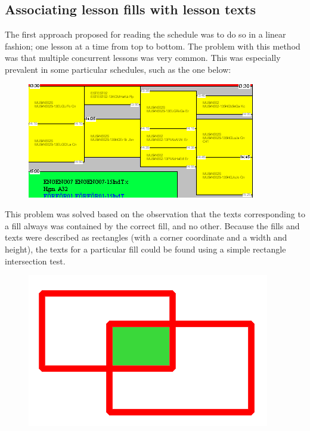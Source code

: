 \documentclass{article}
\begin{document}
	\subsection{Associating lesson fills with lesson texts}
	The first approach proposed for reading the schedule was to do so in a linear fashion; one lesson at a time from top to bottom. The problem with this method was that multiple concurrent lessons was very common. This was especially prevalent in some particular schedules, such as the one below:
	
	\begin{figure}[h]%
		\centering
		\includegraphics[width=0.7\linewidth]{images/schedule-13esmu}
		\caption{}
		\label{fig:schedule-13esmu}
	\end{figure}
	
	This problem was solved based on the observation that the texts corresponding to a fill always was contained by the correct fill, and no other. Because the fills and texts were described as rectangles (with a corner coordinate and a width and height), the texts for a particular fill could be found using a simple rectangle intersection test.
	
	\begin{figure}[!h]
		\centering
		\includegraphics[width=0.1\linewidth]{images/rectangles-intersecting}
		\caption{}
		\label{fig:rectangles-intersecting}
	\end{figure}
	
\end{document}
